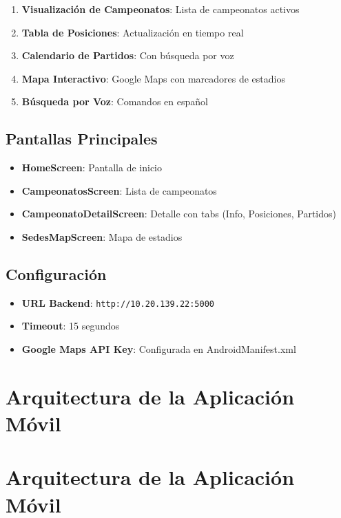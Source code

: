 \documentclass[
  spanish,
  11pt,
  letterpaper,
]{book}
\providecommand{\tightlist}{%
  \setlength{\itemsep}{0pt}\setlength{\parskip}{0pt}}
\begin{document}
\begin{enumerate}
\def\labelenumi{\arabic{enumi}.}
\tightlist
\item
  \textbf{Visualización de Campeonatos}: Lista de campeonatos activos
\item
  \textbf{Tabla de Posiciones}: Actualización en tiempo real
\item
  \textbf{Calendario de Partidos}: Con búsqueda por voz
\item
  \textbf{Mapa Interactivo}: Google Maps con marcadores de estadios
\item
  \textbf{Búsqueda por Voz}: Comandos en español
\end{enumerate}

\section{Pantallas Principales}\label{pantallas-principales}

\begin{itemize}
\tightlist
\item
  \textbf{HomeScreen}: Pantalla de inicio
\item
  \textbf{CampeonatosScreen}: Lista de campeonatos
\item
  \textbf{CampeonatoDetailScreen}: Detalle con tabs (Info, Posiciones,
  Partidos)
\item
  \textbf{SedesMapScreen}: Mapa de estadios
\end{itemize}

\section{Configuración}\label{configuraciuxf3n-1}

\begin{itemize}
\tightlist
\item
  \textbf{URL Backend}: \texttt{http://10.20.139.22:5000}
\item
  \textbf{Timeout}: 15 segundos
\item
  \textbf{Google Maps API Key}: Configurada en AndroidManifest.xml
\end{itemize}

\chapter{Arquitectura de la Aplicación
Móvil}\label{arquitectura-de-la-aplicaciuxf3n-muxf3vil}

\chapter{Arquitectura de la Aplicación
Móvil}\label{arquitectura-de-la-aplicaciuxf3n-muxf3vil-1}
\end{document}
